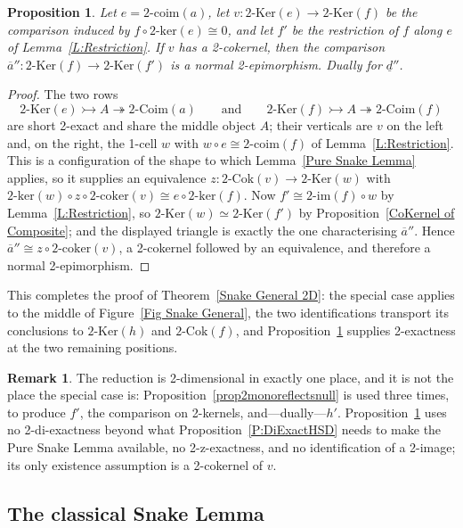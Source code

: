 \documentclass[reqno,a4paper]{amsart}
\numberwithin{equation}{section}
\theoremstyle{plain}
\newtheorem{proposition}[subsection]{Proposition}
\theoremstyle{definition}
\newtheorem{remark}[subsection]{Remark}
\def\nameit#1{\textrm{#1}~}
\def\thex{\nameit{Theorem}}
\def\prox{\nameit{Proposition}}
\def\lemx{\nameit{Lemma}}
\newcommand{\comp}{\circ}
\newcommand{\iso}{\cong}
\newcommand{\ov}[1]{\overline{#1}}
\renewcommand{\1}{\onecat{1}}
\newcommand{\TwoKer}{\ensuremath{2\text{-}\mathrm{Ker}}}
\newcommand{\TwoCoker}{\ensuremath{2\text{-}\mathrm{Cok}}}
\newcommand{\twoker}{\ensuremath{2\text{-}\mathrm{ker}}}
\newcommand{\twocoker}{\ensuremath{2\text{-}\mathrm{coker}}}
\newcommand{\twoimg}{\ensuremath{2\text{-}\mathrm{im}}}
\newcommand{\TwoCoim}{\ensuremath{2\text{-}\mathrm{Coim}}}
\newcommand{\twocoim}{\ensuremath{2\text{-}\mathrm{coim}}}
\begin{document}
\begin{proposition}\label{P:KerComparison}
	Let \(e=\twocoim(a)\), let \(v\colon\TwoKer(e)\to\TwoKer(f)\) be the comparison induced by \(f\comp\twoker(e)\iso 0\), and let \(f'\) be the restriction of \(f\) along \(e\) of \lemx\ref{L:Restriction}. If \(v\) has a 2-cokernel, then the comparison \(\ov{a}''\colon\TwoKer(f)\to\TwoKer(f')\) is a normal 2-epimorphism. Dually for \(\underline{d}''\).
\end{proposition}
\begin{proof}
	The two rows
	\[
		\TwoKer(e)\rightarrowtail A\twoheadrightarrow\TwoCoim(a)
		\qquad\text{and}\qquad
		\TwoKer(f)\rightarrowtail A\twoheadrightarrow\TwoCoim(f)
	\]
	are short 2-exact and share the middle object \(A\); their verticals are \(v\) on the left and, on the right, the 1-cell \(w\) with \(w\comp e\iso\twocoim(f)\) of \lemx\ref{L:Restriction}. This is a configuration of the shape to which \lemx\ref{Pure Snake Lemma} applies, so it supplies an equivalence \(z\colon\TwoCoker(v)\to\TwoKer(w)\) with \(\twoker(w)\comp z\comp\twocoker(v)\iso e\comp\twoker(f)\). Now \(f'\iso\twoimg(f)\comp w\) by \lemx\ref{L:Restriction}, so \(\TwoKer(w)\simeq\TwoKer(f')\) by \prox\ref{CoKernel of Composite}; and the displayed triangle is exactly the one characterising \(\ov{a}''\). Hence \(\ov{a}''\iso z\comp\twocoker(v)\), a 2-cokernel followed by an equivalence, and therefore a normal 2-epimorphism.
\end{proof}

This completes the proof of \thex\ref{Snake General 2D}: the special case applies to the middle of Figure~\ref{Fig Snake General}, the two identifications transport its conclusions to \(\TwoKer(h)\) and \(\TwoCoker(f)\), and \prox\ref{P:KerComparison} supplies 2-exactness at the two remaining positions.

\begin{remark}\label{Rem General Cost}
	The reduction is 2-dimensional in exactly one place, and it is not the place the special case is: \prox\ref{prop2monoreflectsnull} is used three times, to produce \(f'\), the comparison on 2-kernels, and---dually---\(h'\). \prox\ref{P:KerComparison} uses no 2-di-exactness beyond what \prox\ref{P:DiExactHSD} needs to make the Pure Snake Lemma available, no 2-z-exactness, and no identification of a 2-image; its only existence assumption is a 2-cokernel of \(v\).
\end{remark}

\subsection{The classical Snake Lemma}\label{SS:Classical}
\end{document}
